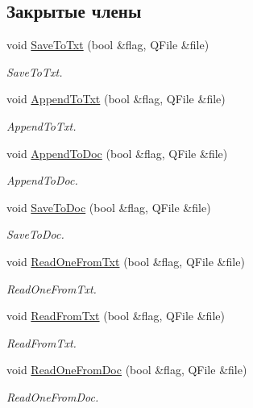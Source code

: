 \subsection*{Закрытые члены}
\begin{DoxyCompactItemize}
\item 
void \hyperlink{class_main_window_a64f7c1216a075bf75d3c2e7fb88fd371}{Save\+To\+Txt} (bool \&flag, Q\+File \&file)
\begin{DoxyCompactList}\small\item\em Save\+To\+Txt. \end{DoxyCompactList}\item 
void \hyperlink{class_main_window_ada72ba7c0365cd69528339a0298941d2}{Append\+To\+Txt} (bool \&flag, Q\+File \&file)
\begin{DoxyCompactList}\small\item\em Append\+To\+Txt. \end{DoxyCompactList}\item 
void \hyperlink{class_main_window_ab31b6edb24cdb7744f4ab4db3300b29c}{Append\+To\+Doc} (bool \&flag, Q\+File \&file)
\begin{DoxyCompactList}\small\item\em Append\+To\+Doc. \end{DoxyCompactList}\item 
void \hyperlink{class_main_window_aa84cdb1ab42ba6621bf43fc2d126bcf4}{Save\+To\+Doc} (bool \&flag, Q\+File \&file)
\begin{DoxyCompactList}\small\item\em Save\+To\+Doc. \end{DoxyCompactList}\item 
void \hyperlink{class_main_window_a50c6d26a5751b97d502334de0c43fcef}{Read\+One\+From\+Txt} (bool \&flag, Q\+File \&file)
\begin{DoxyCompactList}\small\item\em Read\+One\+From\+Txt. \end{DoxyCompactList}\item 
void \hyperlink{class_main_window_ac280af7b364789fa7b6e2274fb8a9e2a}{Read\+From\+Txt} (bool \&flag, Q\+File \&file)
\begin{DoxyCompactList}\small\item\em Read\+From\+Txt. \end{DoxyCompactList}\item 
void \hyperlink{class_main_window_a72ec1547630d1af06f61888bb623fad6}{Read\+One\+From\+Doc} (bool \&flag, Q\+File \&file)
\begin{DoxyCompactList}\small\item\em Read\+One\+From\+Doc. \end{DoxyCompactList}\item 

\end{DoxyCompactItemize}
